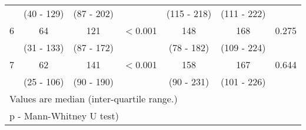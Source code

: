 \begin{table}[h]
\begin{tabular}{| c | c c c | c c c |}
		           & (40 - 129)  & (87 - 202)  &                 & (115 - 218) & (111 - 222) &  \\
		6          & 64          & 121         & $<$0.001        & 148         & 168         & 0.275           \\
		           & (31 - 133)  & (87 - 172)  &                 & (78 - 182)  & (109 - 224) &  \\
		7          & 62          & 141         & $<$0.001        & 158         & 167         & 0.644           \\
		           & (25 - 106)  & (90 - 190)  &                 & (90 - 231)  & (101 - 226) &  \\ \hline
		\multicolumn{7}{l}{Values are median (inter-quartile range.)}                                          \\
		\multicolumn{7}{l}{p - Mann-Whitney U test)}
	\end{tabular}
\end{table}